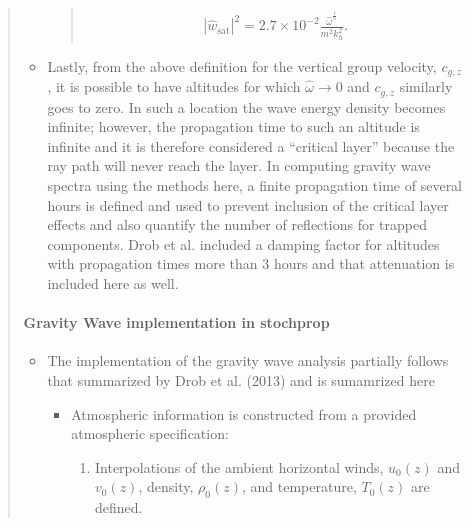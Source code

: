 \documentclass[letterpaper,10pt,english]{sphinxmanual}
\begin{document}
\begin{itemize}
\begin{quote}
\begin{itemize}
\begin{quote}
\begin{itemize}
\end{itemize}
\begin{equation*}
\begin{split}\left| \hat{w}_\text{sat} \right|^2 = 2.7 \times 10^{-2} \frac{\hat{\omega}^\frac{1}{3}}{m^2 k_h^2}.\end{split}
\end{equation*}\end{quote}

\item {} 
\sphinxAtStartPar
Lastly, from the above definition for the vertical group velocity, \(c_{g,z}\), it is possible to have altitudes for which \(\hat{\omega} \rightarrow 0\) and \(c_{g,z}\) similarly goes to zero.  In such a location the wave energy density becomes infinite; however, the propagation time to such an altitude is infinite and it is therefore considered a “critical layer” because the ray path will never reach the layer.  In computing gravity wave spectra using the methods here, a finite propagation time of several hours is defined and used to prevent inclusion of the critical layer effects and also quantify the number of reflections for trapped components.  Drob et al. included a damping factor for altitudes with propagation times more than 3 hours and that attenuation is included here as well.

\end{itemize}


\paragraph{Gravity Wave implementation in stochprop}
\label{\detokenize{gravity:gravity-wave-implementation-in-stochprop}}\begin{itemize}
\item {} 
\sphinxAtStartPar
The implementation of the gravity wave analysis partially follows that summarized by Drob et al. (2013) and is sumamrized here
\begin{itemize}
\item {} 
\sphinxAtStartPar
Atmospheric information is constructed from a provided atmospheric specification:
\begin{enumerate}
%
\item {} 
\sphinxAtStartPar
Interpolations of the ambient horizontal winds, \(u_0 \left( z \right)\) and \(v_0 \left( z \right)\), density, \(\rho_0 \left( z \right)\), and temperature, \(T_0 \left( z \right)\) are defined.


\end{enumerate}
\end{itemize}
\end{itemize}
\end{quote}
\end{itemize}
\end{document}
